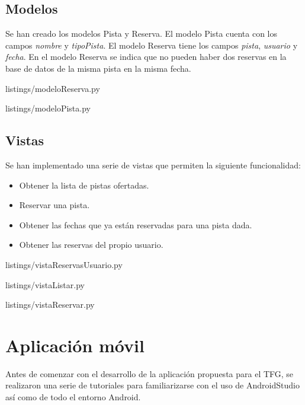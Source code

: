 \subsection{Modelos}
Se han creado los modelos Pista y Reserva. El modelo Pista cuenta con los campos \textit{nombre} y \textit{tipoPista}. El modelo Reserva tiene los campos \textit{pista}, \textit{usuario} y \textit{fecha}. En el modelo Reserva se indica que no pueden haber dos reservas en la base de datos de la misma pista en la misma fecha.
\newline 


{listings/modeloReserva.py} %


{listings/modeloPista.py} %

\subsection{Vistas}
Se han implementado una serie de vistas que permiten la siguiente funcionalidad: 
\begin{itemize}
\item Obtener la lista de pistas ofertadas.
\item Reservar una pista.
\item Obtener las fechas que ya están reservadas para una pista dada.
\item Obtener las reservas del propio usuario.
\end{itemize}


{listings/vistaReservasUsuario.py} %
\newpage

{listings/vistaListar.py} %


{listings/vistaReservar.py} %

\section{Aplicación móvil}

Antes de comenzar con el desarrollo de la aplicación propuesta para el TFG, se 
realizaron una serie de tutoriales \cite{URL::GettingStarted} 
para familiarizarse con el uso de AndroidStudio así como de todo el entorno Android.


